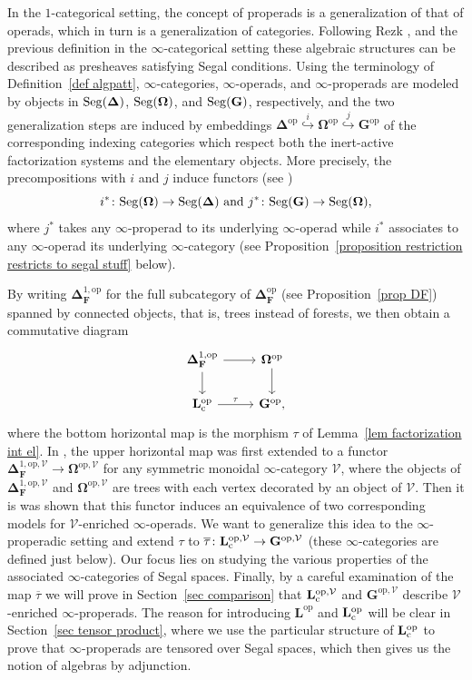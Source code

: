 \documentclass{amsart}
\numberwithin{theorem}{subsection}
\theoremstyle{definition}
\providecommand{\op}{\mathrm{op}}
\newcommand{\finsetskel}{\mathbf{F}}
\newcommand{\xV}{\mathcal{V}}
\newcommand{\name}[1]{\ensuremath{\text{\textup{#1}}}}
\newcommand{\simp}{\mathbf{\Delta}}
\newcommand{\bbO}{\mathbf{\Omega}}
\newcommand{\levelg}{\mathbf{L}}
\newcommand{\levelgconn}{\levelg_{\name{c}}}
\newcommand{\oplevelcV}{\levelgconn^{\op,\xV}}
\newcommand{\bbY}{\mathbf{G}}
\newcommand{\opbbYV}{\bbY^{\op,\xV}}
\newcommand{\bartau}{\overline{\tau}}
\newcommand{\Seg}{\name{Seg}}
\begin{document}
In the $1$-categorical setting, the concept of properads is a generalization of that of operads, which in turn is a generalization of categories. 
Following Rezk \cite{Rezk}, \cite{CisinkiMoerdijk2} and the previous definition in the $\infty$-categorical setting these algebraic structures can be described as presheaves satisfying Segal conditions. 
Using the terminology of Definition~\ref{def algpatt}, $\infty$-categories, $\infty$-operads, and $\infty$-properads are modeled by objects in $\Seg(\simp)$, $\Seg(\bbO)$, and $\Seg(\bbY)$, respectively, and the two generalization steps are induced by embeddings $\simp^{\op} \overset{i}{\hookrightarrow} \bbO^\op \overset{j}{\hookrightarrow} \bbY^\op $ of the corresponding indexing categories which respect both the inert-active factorization systems and the elementary objects. 
More precisely, the precompositions with $i$ and $j$ induce functors (see \cite[Lemma 4.5]{patterns1})
\[i^*\colon \Seg(\bbO)\to \Seg(\simp)\text{ and } j^*\colon \Seg(\bbY)\to \Seg(\bbO),\]
where $j^*$ takes any $\infty$-properad to its underlying $\infty$-operad while $i^*$ associates to any $\infty$-operad its underlying $\infty$-category
(see Proposition~\ref{proposition restriction restricts to segal stuff} below).

By writing $\simp_{\finsetskel}^{1, \op}$ for the full subcategory of $\simp_{\finsetskel}^{\op}$ (see Proposition~\ref{prop DF}) spanned by connected objects, that is, trees instead of forests, we then obtain a commutative diagram
\[
\begin{tikzcd}
\simp_{\finsetskel}^{1,\op} \arrow{r}\arrow{d} & \bbO ^\op \arrow{d}\\
\levelgconn^\op \arrow {r}{\tau} & \bbY^\op,
\end{tikzcd}
\]
where the bottom horizontal map is the morphism $\tau$ of Lemma~\ref{lem factorization int el}.
In \cite{ChuHaugseng}, the upper horizontal map was first extended to a functor $\simp_{\finsetskel}^{1,\op, \xV}\to \bbO^{\op,\xV}$ for any symmetric monoidal $\infty$-category $\xV$, where the objects of $\simp_{\finsetskel}^{1,\op, \xV}$ and $\bbO^{\op,\xV}$ are trees with each vertex decorated by an object of $\xV$.
Then it is was shown that this functor induces an equivalence of two corresponding models for $\xV$-enriched $\infty$-operads. 
We want to generalize this idea to the $\infty$-properadic setting and extend $\tau$ to $\bartau \colon \oplevelcV \to \opbbYV$ (these $\infty$-categories are defined just below). 
Our focus lies on studying the various properties of the associated $\infty$-categories of Segal spaces. 
Finally, by a careful examination of the map $\bartau$ we will prove in Section~\ref{sec comparison} that $\oplevelcV$ and $\opbbYV$ describe $\xV$-enriched $\infty$-properads.
The reason for introducing $\levelg^\op$ and $\levelgconn^\op$ will be clear in Section~\ref{sec tensor product}, where we use the particular structure of $\levelgconn^\op$ to prove that $\infty$-properads are tensored over Segal spaces, which then gives us the notion of algebras by adjunction.
\end{document}
